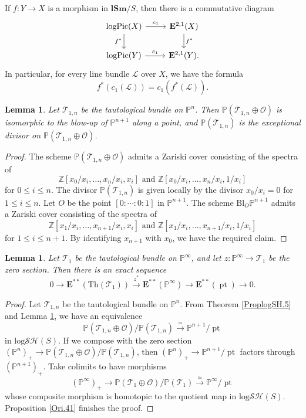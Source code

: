 \documentclass[11pt, a4paper]{amsart}
\newtheorem{lem}[thm]{Lemma}
\theoremstyle{definition}
\numberwithin{equation}{subsection}
\newcommand{\Z}{\mathbb{Z}}
\renewcommand{\P}{\mathbb{P}}
\newcommand{\lSm}{\mathbf{lSm}}
\newcommand{\pt}[1]{\mathrm{\pt}_{#1}}
\newcommand{\Blow}{{\mathrm{Bl}}}
\newcommand{\Thom}{\mathrm{Th}}
\newcommand{\logPic}{\operatorname{logPic}}
\newcommand{\cL}{\mathcal{L}}
\newcommand{\cO}{\mathcal{O}}
\newcommand{\cT}{\mathcal{T}}
\def\pt{\operatorname{pt}}
\newcommand{\ringE}{\mathbf{E}}
\newcommand{\inflogSH}{\mathrm{log}\mathcal{SH}}
\begin{document}
If $f\colon Y\to X$ is a morphism in $\lSm/S$, then there is a commutative diagram
\[
\begin{tikzcd}
\logPic(X)\ar[d,"f^*"']\ar[r,"c_1"]&
\ringE^{2,1}(X)\ar[d,"f^*"]
\\
\logPic(Y)\ar[r,"c_1"]&
\ringE^{2,1}(Y).
\end{tikzcd}
\]
In particular, for every line bundle $\cL$ over $X$, we have the formula
\begin{equation}
\label{Ori.7.4}
f^*(c_1(\cL))=c_1(f^*(\cL)).
\end{equation}

\begin{lem}
\label{Ori.48}
Let $\cT_{1,n}$ be the tautological bundle on $\P^n$.
Then $\P(\cT_{1,n}\oplus \cO)$ is isomorphic to the blow-up of $\P^{n+1}$ along a point, and $\P(\cT_{1,n})$ is the exceptional divisor on $\P(\cT_{1,n}\oplus \cO)$.
\end{lem}
\begin{proof}
The scheme $\P(\cT_{1,n}\oplus \cO)$ admits a Zariski cover consisting of the spectra of 
\[
\Z[x_0/x_i,\ldots,x_n/x_i,x_i]
\text{ and }
\Z[x_0/x_i,\ldots,x_n/x_i,1/x_i]
\]
for $0\leq i\leq n$.
The divisor $\P(\cT_{1,n})$ is given locally by the divisor $x_0/x_i=0$ for $1\leq i\leq n$.
Let $O$ be the point $[0:\cdots:0:1]$ in $\P^{n+1}$.
The scheme $\Blow_O \P^{n+1}$ admits a Zariski cover consisting of the spectra of
\[
\Z[x_1/x_i,\ldots,x_{n+1}/x_i,x_i]
\text{ and }
\Z[x_1/x_i,\ldots,x_{n+1}/x_i,1/x_i]
\]
for $1\leq i\leq n+1$.
By identifying $x_{n+1}$ with $x_0$, we have the required claim.
\end{proof}

\begin{lem}
\label{Ori.49}
Let $\cT_{1}$ be the tautological bundle on $\P^\infty$, and let $z\colon \P^\infty\to \cT_1$ be the zero section.
Then there is an exact sequence
\begin{equation}
\label{Ori.49.1}
0
\to
\ringE^{**}(\Thom(\cT_1))
\xrightarrow{z^*}
\ringE^{**}(\P^\infty)
\to
\ringE^{**}(\pt)
\to
0.
\end{equation}
\end{lem}
\begin{proof}
Let $\cT_{1,n}$ be the tautological bundle on $\P^n$.
From Theorem \ref{ProplogSH.5} and Lemma \ref{Ori.48}, we have an equivalence
\[
\P(\cT_{1,n}\oplus \cO)/\P(\cT_{1,n})
\xrightarrow{\simeq}
\P^{n+1}/\pt
\]
in $\inflogSH(S)$.
If we compose with the zero section $(\P^n)_+\to \P(\cT_{1,n}\oplus \cO)/\P(\cT_{1,n})$, then $(\P^n)_+\to \P^{n+1}/\pt$ factors through $(\P^{n+1})_+$.
Take colimits to have morphisms
\[
(\P^\infty)_+ \to  \P(\cT_{1}\oplus \cO)/\P(\cT_{1}) \xrightarrow{\simeq} \P^\infty/\pt
\]
whose composite morphism is homotopic to the quotient map in $\inflogSH(S)$.
Proposition \ref{Ori.41} finishes the proof.
\end{proof}
\end{document}
